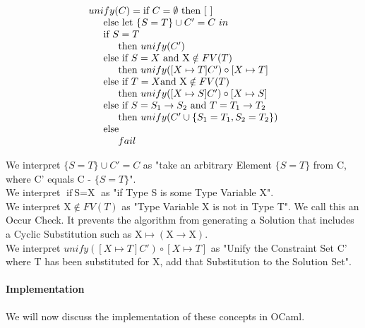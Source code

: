 \documentclass{article}
\begin{document}
\begin{equation*}
\begin{array}{l}
    unify(C) = \text{if} \ C = \emptyset \ \text{then} \ [ \ ] \\
    \indent \text{else let} \ \{S = T\} \cup C' = C \ in \\
    \indent \text{if} \ S = T \\
    \indent\indent \text{then} \ unify(C') \\
    \indent \text{else if} \ S = X \ \text{and X} \notin FV(T) \\
    \indent\indent \text{then} \ unify([X \mapsto T]C') \circ [X \mapsto T] \\
    \indent \text{else if} \ T = X \text{and X} \notin FV(T) \\
    \indent\indent \text{then} \ unify([X \mapsto S]C') \circ [X \mapsto S] \\
    \indent \text{else if} \ S = S_{1} \to S_{2} \ \text{and} \ T = T_{1} \to T_{2} \\
    \indent\indent \text{then} \ unify(C' \cup \{S_{1} = T_{1},S_{2} = T_{2}\}) \\
    \indent \text{else} \\
    \indent\indent fail
\end{array}
\end{equation*}

\noindent We interpret $\{S = T\} \cup C' = C$ as "take an arbitrary Element $\{S = T\}$ from C, where C' equals C - $\{S = T\}$".\\

\noindent We interpret $\text{if} \ \text{S} = \text{X}$ as "if Type S is some Type Variable X".\\

\noindent We interpret $\text{X} \notin FV(T)$ as "Type Variable X is not in Type T". We call this an Occur Check. It prevents the algorithm from generating a Solution that includes a Cyclic Substitution such as $\text{X} \mapsto (\text{X} \to \text{X})$.\\

\noindent We interpret $unify([X \mapsto T]C') \circ [X \mapsto T]$ as "Unify the Constraint Set C' where T has been substituted for X, add that Substitution to the Solution Set".


\paragraph{Implementation}
We will now discuss the implementation of these concepts in OCaml. \\
\end{document}
